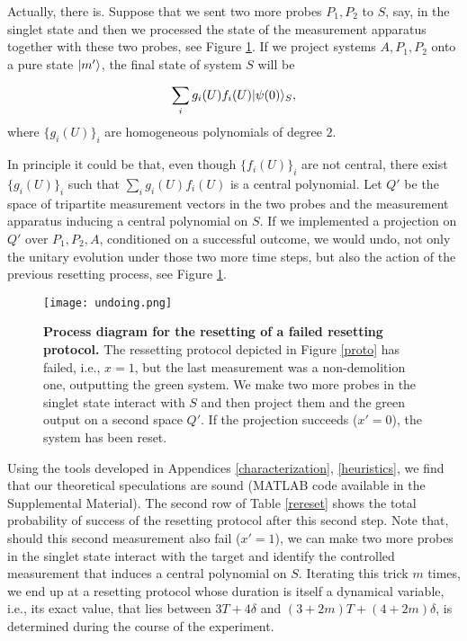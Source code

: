 \documentclass[twocolumn,prx,aps,longbibliography]{revtex4-1}
\def\be{\begin{equation}}
\def\ee{\end{equation}}
\begin{document}
Actually, there is. Suppose that we sent two more probes $P_1,P_2$ to $S$, say, in the singlet state and then we processed the state of the measurement apparatus together with these two probes, see Figure \ref{undoing}. If we project systems $A,P_1,P_2$ onto a pure state $|m'\rangle$, the final state of system $S$ will be

\be
\sum_{i}g_i(U)f_i(U)\ket{\psi(0)}_S,
\label{undoingF}
\ee
\noindent where $\{g_i(U)\}_i$ are homogeneous polynomials of degree $2$. 


In principle it could be that, even though $\{f_i(U)\}_i$ are not central, there exist $\{g_i(U)\}_i$ such that $\sum_{i}g_i(U)f_i(U)$ is a central polynomial. Let $Q'$ be the space of tripartite measurement vectors in the two probes and the measurement apparatus inducing a central polynomial on $S$. If we implemented a projection on $Q'$ over $P_1,P_2,A$, conditioned on a successful outcome, we would undo, not only the unitary evolution under those two more time steps, but also the action of the previous resetting process, see Figure \ref{undoing}.


\begin{figure}
  \centering
  \texttt{[image: undoing.png]}
  \caption{\textbf{Process diagram for the resetting of a failed resetting protocol.} The ressetting protocol depicted in Figure \ref{proto} has failed, i.e., $x=1$, but the last measurement was a non-demolition one, outputting the green system. We make two more probes in the singlet state interact with $S$ and then project them and the green output on a second space $Q'$. If the projection succeeds ($x'=0$), the system has been reset.}
  \label{undoing}
\end{figure}



Using the tools developed in Appendices \ref{characterization}, \ref{heuristics}, we find that our theoretical speculations are sound (MATLAB code available in the Supplemental Material). The second row of Table \ref{rereset} shows the total probability of success of the resetting protocol after this second step. Note that, should this second measurement also fail ($x'=1$), we can make two more probes in the singlet state interact with the target and identify the controlled measurement that induces a central polynomial on $S$. Iterating this trick $m$ times, we end up at a resetting protocol whose duration is itself a dynamical variable, i.e., its exact value, that lies between $3T+4\delta$ and $(3+2m)T+(4+2m)\delta$, is determined during the course of the experiment.
\end{document}
